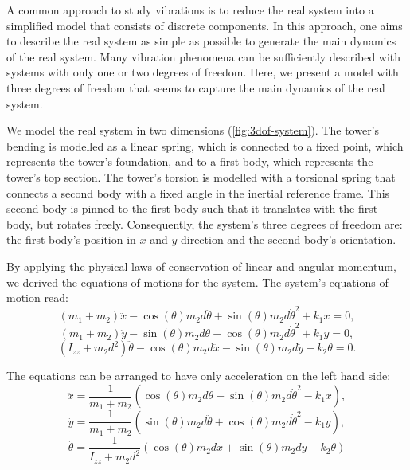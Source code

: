 \documentclass{article}
\begin{document}
A common approach to study vibrations is to reduce the real system into a simplified model that consists of discrete components. In this approach, one aims to describe the real system as simple as possible to generate the main dynamics of the real system. Many vibration phenomena can be sufficiently described with systems with only one or two degrees of freedom. Here, we present a model with three degrees of freedom that seems to capture the main dynamics of the real system.
\par 
We model the real system in two dimensions (\autoref{fig:3dof-system}). The tower's bending is modelled as a linear spring, which is connected to a fixed point, which represents the tower's foundation, and to a first body, which represents the tower's top section. The tower's torsion is modelled with a torsional spring that connects a second body with a fixed angle in the inertial reference frame. This second body is pinned to the first body such that it translates with the first body, but rotates freely. Consequently, the system's three degrees of freedom are: the first body's position in $x$ and $y$ direction and the second body's orientation.
\par 
By applying the physical laws of conservation of linear and angular momentum, we derived the equations of motions for the system. The system's equations of motion read:
\begin{equation}
    (m_1 + m_2) \ddot{x} - \cos(\theta) m_2 d \ddot{\theta} + \sin(\theta) m_2 d \dot{\theta}^2 + k_1 x = 0,\label{eq:eom-x}
\end{equation}
\begin{equation}
    (m_1 + m_2) \ddot{y} - \sin(\theta) m_2 d \ddot{\theta} - \cos(\theta) m_2 d \dot{\theta}^2 + k_1 y = 0,\label{eq:eom-y}
\end{equation}
\begin{equation}
    (I_{zz} + m_2 d^2)\ddot{\theta} - \cos(\theta) m_2 d \ddot{x} - \sin(\theta)m_2 d \ddot{y} + k_2 \theta = 0.\label{eq:eom-theta}
\end{equation}

The equations can be arranged to have only acceleration on the left hand side:
\begin{equation}
    \ddot{x} = \frac{1}{m_1 + m_2} \left( \cos(\theta) m_2 d \ddot{\theta} - \sin(\theta) m_2 d \dot{\theta}^2 - k_1 x \right),\label{eq:eom2-x}
\end{equation}
\begin{equation}
   \ddot{y} = \frac{1}{m_1 + m_2} \left(\sin(\theta) m_2 d \ddot{\theta} + \cos(\theta) m_2 d \dot{\theta}^2 - k_1 y \right),\label{eq:eom2-y}
\end{equation}
\begin{equation}
    \ddot{\theta} = \frac{1}{I_{zz} + m_2 d^2} \left(\cos(\theta) m_2 d \ddot{x} + \sin(\theta)m_2 d \ddot{y} - k_2 \theta \right) \label{eq:eom2-theta}
\end{equation}
\end{document}
